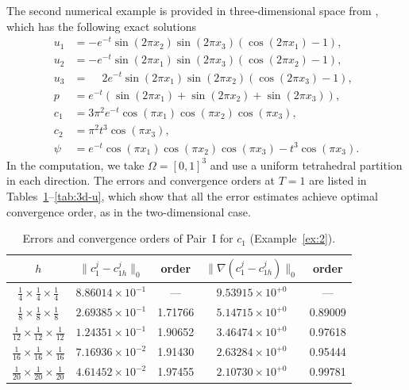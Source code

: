 \begin{example}
\label{ex:2}
The second numerical example is provided in three-dimensional space from \cite{Gao2017,Li22023},
which has the following exact solutions
\begin{align}
  u_{1} &= -e^{-t}\sin(2\pi x_{2})\sin(2\pi x_{3})\!\left(\cos(2\pi x_{1}) - 1\right),
  \nonumber\\
  u_{2} &= -e^{-t}\sin(2\pi x_{1})\sin(2\pi x_{3})\!\left(\cos(2\pi x_{2}) - 1\right),
  \nonumber\\
  u_{3} &= \phantom{-}2e^{-t}\sin(2\pi x_{1})\sin(2\pi x_{2})\!\left(\cos(2\pi x_{3}) - 1\right),
  \nonumber\\
  p     &= e^{-t}\!\left(\sin(2\pi x_{1}) + \sin(2\pi x_{2}) + \sin(2\pi x_{3})\right),
  \nonumber\\
  c_{1} &= 3\pi^{2}e^{-t}\cos(\pi x_{1})\cos(\pi x_{2})\cos(\pi x_{3}),
  \nonumber\\
  c_{2} &= \pi^{2}t^{3}\cos(\pi x_{3}),
  \nonumber\\
  \psi  &= e^{-t}\cos(\pi x_{1})\cos(\pi x_{2})\cos(\pi x_{3}) - t^{3}\cos(\pi x_{3}).
  \label{eq:ex2-exact}
\end{align}
In the computation, we take $\Omega = [0,1]^{3}$ and use a uniform tetrahedral partition in
each direction. The errors and convergence orders at $T = 1$ are listed in
Tables~\ref{tab:3d-c1}--\ref{tab:3d-u}, which show that all the error estimates achieve
optimal convergence order, as in the two-dimensional case.
\end{example}


\begin{table}[htbp]
\centering
\caption{Errors and convergence orders of Pair~I for $c_{1}$ (Example~\ref{ex:2}).}
\label{tab:3d-c1}
\begin{tabular}{ccccc}
\hline
$h$ &
$\|c_{1}^{j} - c_{1h}^{j}\|_{0}$ & order &
$\|\nabla(c_{1}^{j} - c_{1h}^{j})\|_{0}$ & order \\
\hline
$\tfrac{1}{4}  \times \tfrac{1}{4}  \times \tfrac{1}{4}$  & $8.86014\times10^{-1}$ & ---     & $9.53915\times10^{+0}$ & ---     \\
$\tfrac{1}{8}  \times \tfrac{1}{8}  \times \tfrac{1}{8}$  & $2.69385\times10^{-1}$ & 1.71766 & $5.14715\times10^{+0}$ & 0.89009 \\
$\tfrac{1}{12} \times \tfrac{1}{12} \times \tfrac{1}{12}$ & $1.24351\times10^{-1}$ & 1.90652 & $3.46474\times10^{+0}$ & 0.97618 \\
$\tfrac{1}{16} \times \tfrac{1}{16} \times \tfrac{1}{16}$ & $7.16936\times10^{-2}$ & 1.91430 & $2.63284\times10^{+0}$ & 0.95444 \\
$\tfrac{1}{20} \times \tfrac{1}{20} \times \tfrac{1}{20}$ & $4.61452\times10^{-2}$ & 1.97455 & $2.10730\times10^{+0}$ & 0.99781 \\
\hline
\end{tabular}
\end{table}

